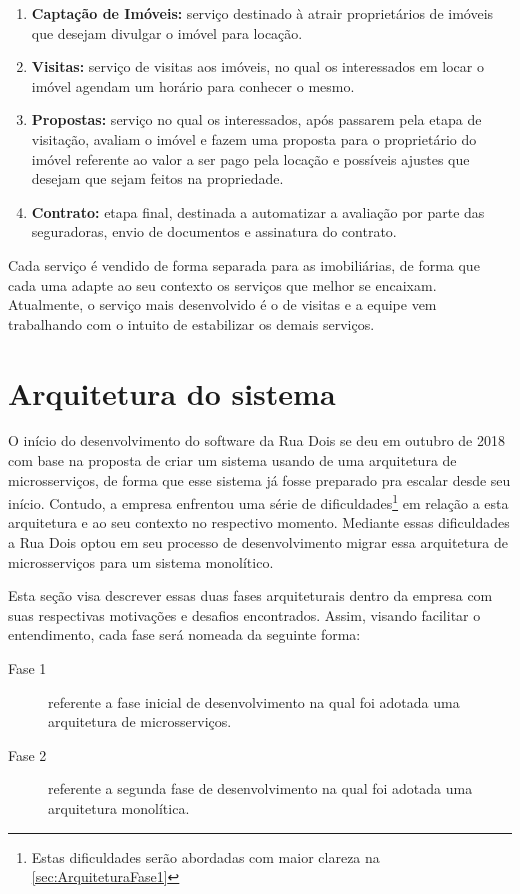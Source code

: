   \begin{enumerate}
    \item \textbf{Captação de Imóveis:} serviço destinado à atrair proprietários de
      imóveis que desejam divulgar o imóvel para locação.
    \item \textbf{Visitas:} serviço de visitas aos imóveis, no qual os interessados em
      locar o imóvel agendam um horário para conhecer o mesmo.
    \item \textbf{Propostas:} serviço no qual os interessados, após passarem pela etapa
      de visitação, avaliam o imóvel e fazem uma proposta para o proprietário do
      imóvel referente ao valor a ser pago pela locação e possíveis ajustes que
      desejam que sejam feitos na propriedade.
    \item \textbf{Contrato:} etapa final, destinada a automatizar a avaliação por parte
      das seguradoras, envio de documentos e assinatura do contrato.
  \end{enumerate}

Cada serviço é vendido de forma separada para as imobiliárias, de forma que cada uma
adapte ao seu contexto os serviços que melhor se encaixam. Atualmente, o serviço
mais desenvolvido é o de visitas e a equipe vem trabalhando com o intuito de
estabilizar os demais serviços.

\section{Arquitetura do sistema}
\label{sec:ArquiteturaDoSistema}

O início do desenvolvimento do software da Rua Dois se deu em outubro de 2018 com
base na proposta de criar um sistema usando de uma arquitetura de microsserviços, de
forma que esse sistema já fosse preparado pra escalar desde seu início. Contudo,
a empresa enfrentou uma série de dificuldades\footnote{Estas dificuldades serão abordadas
com maior clareza na \autoref{sec:ArquiteturaFase1}} em relação a esta arquitetura e ao seu
contexto no respectivo momento. Mediante essas dificuldades a Rua Dois optou em seu
processo de desenvolvimento migrar essa arquitetura de microsserviços para um sistema
monolítico.

Esta seção visa descrever essas duas fases arquiteturais dentro da empresa com suas
respectivas motivações e desafios encontrados. Assim, visando facilitar o entendimento,
cada fase será nomeada da seguinte forma:

    \begin{description}
        \item [Fase 1] referente a fase inicial de desenvolvimento na qual foi adotada
        uma arquitetura de microsserviços.
        \item [Fase 2] referente a segunda fase de desenvolvimento na qual foi adotada
        uma arquitetura monolítica.
    \end{description}


